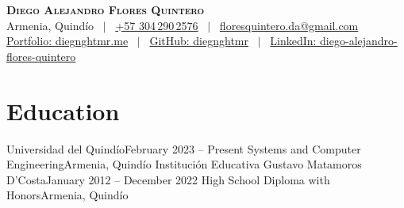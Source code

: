 \documentclass[letterpaper,12pt]{fed-res} %
\begin{document}
\begin{center}
    \textbf{\Huge \scshape Diego Alejandro Flores Quintero} \\ \vspace{1pt}
    Armenia, Quindío \ $|$ \
    \href{http://wa.me/+573042902576}{+57 304\,290\,2576} \ $|$ \
    \href{mailto:floresquintero.da@gmail.com}{floresquintero.da@gmail.com} \\[1pt]
    \href{https://www.diegnghtmr.me}{Portfolio: diegnghtmr.me} \ $|$ \
    \href{https://github.com/diegnghtmr}{GitHub: diegnghtmr} \ $|$ \
    \href{https://www.linkedin.com/in/diego-alejandro-flores-quintero/}{LinkedIn: diego-alejandro-flores-quintero}
\end{center}


\section{Education}
    \resumeSubHeadingListStart
        \resumeSubheading
            {Universidad del Quindío}{February 2023 -- Present}
            {Systems and Computer Engineering}{Armenia, Quindío}
        \resumeSubheading
            {Institución Educativa Gustavo Matamoros D'Costa}{January 2012 -- December 2022}
            {High School Diploma with Honors}{Armenia, Quindío}
    \resumeSubHeadingListEnd

\end{document}
